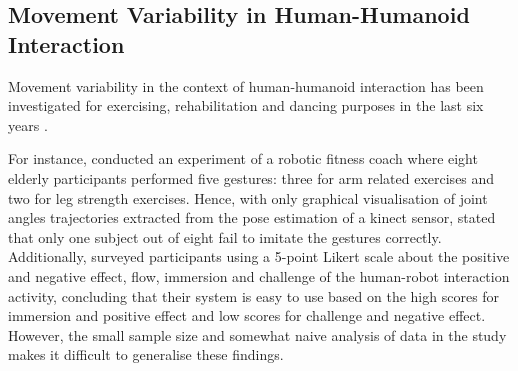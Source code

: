 \subsection{Movement Variability in Human-Humanoid Interaction}
Movement variability in the context of human-humanoid interaction has been 
investigated for exercising, rehabilitation and dancing purposes in the 
last six years
\citep{gorer2013, guneysu2014, guneysu2015, tsuchida2013, peng2015}.

For instance, \cite{gorer2013} conducted an experiment of a robotic 
fitness coach 
where eight elderly participants performed five gestures: 
three for arm related exercises and two for leg strength exercises. 
Hence, \cite{gorer2013} with only graphical 
visualisation of joint angles trajectories extracted from the pose estimation
of a kinect sensor, 
stated that only one subject out of eight fail to imitate the gestures 
correctly.
Additionally,
\cite{gorer2013} surveyed 
participants using a 5-point Likert scale about the positive and 
negative effect, flow, immersion and challenge of the human-robot 
interaction activity, concluding that their system is easy to use 
based on the high scores for immersion and 
positive effect and low scores for challenge and negative effect.
However, the small sample size and somewhat naive analysis of data
in the study makes it difficult to generalise these findings.


